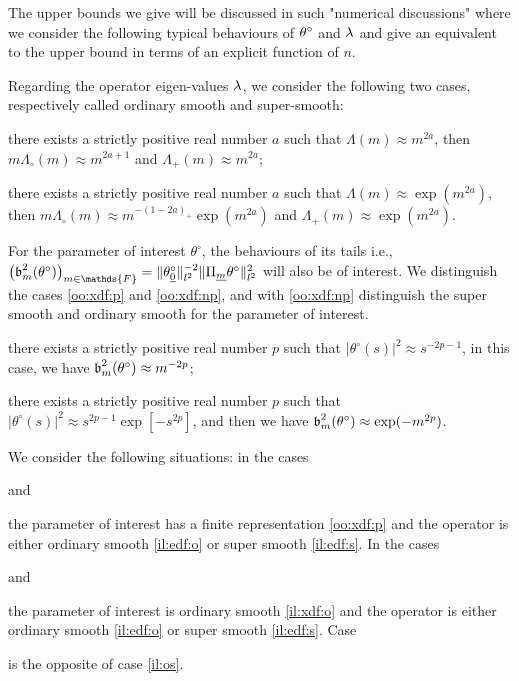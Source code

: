 \begin{il}\label{IL_INTRO_FREQ_DECISION}
The upper bounds we give will be discussed in such "numerical discussions" where we consider the following typical behaviours of $\theta^{\circ}$ and $\lambda$ and give an equivalent to the upper bound in terms of an explicit function of $n$.

Regarding the operator eigen-values $\lambda$, we consider the following two cases, respectively called ordinary smooth and super-smooth:
\begin{Liste}[]
\item[\mylabel{il:edf:o}{\dg\bfseries{(o)}}] there exists a strictly positive real number $a$ such that $\Lambda(m) \approx m^{2a}$, then $m \Lambda_{\circ}(m) \approx m^{2a+1}$ and $\Lambda_{+}(m) \approx m^{2a}$;
\item[\mylabel{il:edf:s}{\dg\bfseries{(s)}}] there exists a strictly positive real number $a$ such that $\Lambda(m) \approx \exp(m^{2a})$, then $m \Lambda_{\circ}(m) \approx m^{-(1-2a)_+}\exp(m^{2a})$ and $\Lambda_{+}(m) \approx \exp(m^{2a})$.
\end{Liste}

For the parameter of interest $\theta^{\circ}$, the behaviours of its tails i.e., $\left(\b_{m}^{2}(\theta^{\circ})\right)_{m \in \mathds{F}} = \Vert \theta^{\circ}_{\underline{0}}\Vert_{l^{2}}^{-2}\Vert \Pi_{\underline{m}} \theta^{\circ} \Vert_{l^{2}}^{2}$ will also be of interest.
We distinguish the cases \ref{oo:xdf:p} and \ref{oo:xdf:np}, and with \ref{oo:xdf:np} distinguish the super smooth and ordinary smooth for the parameter of interest.
\begin{Liste}[]
\item[\mylabel{il:xdf:o}{\dg\bfseries{(o)}}] there exists a strictly positive real number $p$ such that $\vert \theta^{\circ}(s) \vert^{2} \approx s^{-2p -1}$, in this case, we have $\operatorname{\mathfrak{b}}_{m}^2(\theta^{\circ}) \approx m^{-2p}$;
\item[\mylabel{il:xdf:s}{\dg\bfseries{(s)}}] there exists a strictly positive real number $p$ such that $\vert \theta^{\circ}(s) \vert^{2} \approx s^{2p -1} \exp[-s^{2p}]$, and then we have $\operatorname{\mathfrak{b}}_{m}^2(\theta^{\circ}) \approx \exp(-m^{2p})$.
\end{Liste}

We consider the following situations: in the cases \begin{inparaenum}[i]
\item[\mylabel{il:po}{\dg\bfseries{[p-o]}}] and \item[\mylabel{il:ps}{\dg\bfseries{[p-s]}}] the parameter of interest has a finite representation \ref{oo:xdf:p} and the operator is either ordinary smooth \ref{il:edf:o} or super smooth \ref{il:edf:s}.
In the cases \item[\mylabel{il:oo}{\dg\bfseries{[o-o]}}] and \item[\mylabel{il:os}{\dg\bfseries{[o-s]}}] the parameter of interest is ordinary smooth \ref{il:xdf:o} and the operator is either ordinary smooth \ref{il:edf:o} or super smooth \ref{il:edf:s}.
Case \item[\mylabel{il:so}{\dg\bfseries{[s-o]}}] is the opposite of case \ref{il:os}.
\end{inparaenum}
\ilEnd
\end{il}

